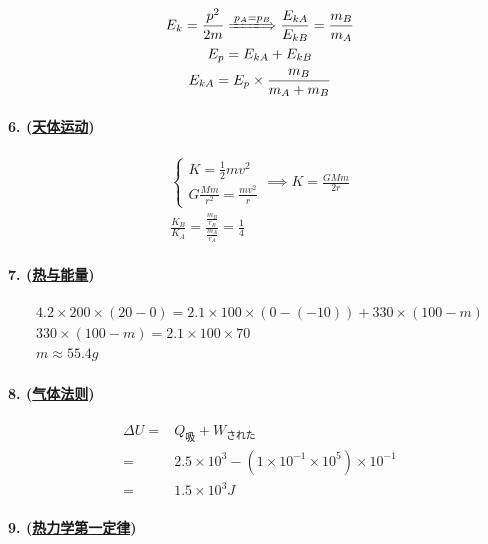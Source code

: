 \begin{gather*}
    E_k=\frac{p^2}{2m}\xLongrightarrow{p_A=p_B}
    \frac{E_{kA}}{E_{kB}}=\frac{m_B}{m_A}\\
    E_p=E_{kA}+E_{kB}\\
    E_{kA}=E_p\times\frac{m_B}{m_A+m_B}
\end{gather*}

\paragraph{6. (\hyperref[subsec:天体运动]{天体运动})}

\begin{gather*}
    \begin{cases}
        K=\frac12mv^2\\
        G\frac{Mm}{r^2}=\frac{mv^2}{r}
    \end{cases}\implies
    K=\frac{GMm}{2r}\\
    \frac{K_B}{K_A}=\frac{\frac{m_B}{r_B}}{\frac{m_A}{r_A}}=\frac14
\end{gather*}

\paragraph{7. (\hyperref[sec:热与能量]{热与能量})}

\begin{gather*}
    4.2\times200\times(20-0)=2.1\times100\times(0-(-10))+330\times(100-m)\\
    330\times(100-m)=2.1\times100\times70\\
    m\approx55.4g
\end{gather*}

\paragraph{8. (\hyperref[subsec:气体法则]{气体法则})}

\begin{align*}
    \Delta U=&Q_\textrm{吸}+W_\textrm{された}\\
    =&2.5\times10^3-(1\times10^{-1}\times10^5)\times10^{-1}\\
    =&1.5\times10^3J
\end{align*}

\paragraph{9. (\hyperref[subsec:热力学第一定律]{热力学第一定律})}

